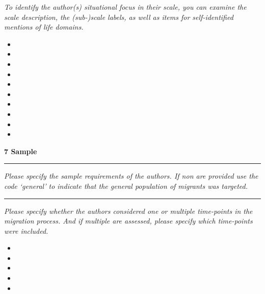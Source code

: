 \documentclass[10pt,a4paper]{protocol}
\newlength{\rulewidth}
\newlength{\ruleandnamegap}
\newcommand{\namefont}{\tiny}
\newcommand{\ruleandname}[2]{%
  \par\noindent
  \rule{#2}{\rulewidth}\par
  \vspace{\dimexpr-\baselineskip+\ruleandnamegap}
  \noindent{\namefont #1}\par
  \addvspace{\baselineskip}
}
\newcommand\category[2]{
{\Large\bfseries\color{emphasis} \vspace{0.25em} #1 \hspace{0.5em} #2 \\ [-0.6em] \rule{\textwidth}{0.4pt} \vspace{0.25em}}
}
\begin{document}
\textit{To identify the author(s) situational focus in their scale, you can examine the scale description, the (sub-)scale labels, as well as items for self-identified mentions of life domains.}
\vspace{0.5em}
\begin{itemize}
	\item {}
    \item {}
    \item {}
    \item {}
    \item {}
    \item {}
    \item {}
    \item {}
    \item {}
    \item {}
\end{itemize}
\divider

\clearpage
\vspace*{2em}

\category{7}{Sample}

\textit{Please specify the sample requirements of the authors. If non are provided use the code `general' to indicate that the general population of migrants was targeted.}
\vspace{1.5em}
\ruleandname{character string}{5cm}
\divider

\textit{Please specify whether the authors considered one or multiple time-points in the migration process. And if multiple are assessed, please specify which time-points were included.}
\vspace{0.5em}
\begin{itemize}
	\item {}
    \item {}
    \item {}
    \item {}
    \item {}
\end{itemize}
\divider
\end{document}
